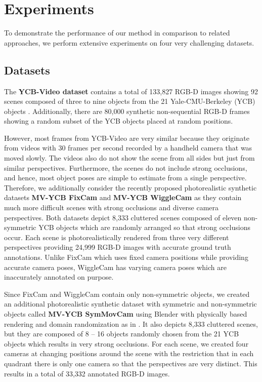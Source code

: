 
\section{Experiments}

To demonstrate the performance of our method in comparison to related approaches, we perform extensive experiments on four very challenging datasets.



\subsection{Datasets}

The {\bf YCB-Video dataset} \cite{posecnn} contains a total of 133,827 RGB-D images showing 92 scenes composed of three to nine objects from the 21 Yale-CMU-Berkeley (YCB) objects \cite{ycb}.
Additionally, there are 80,000 synthetic non-sequential \mbox{RGB-D} frames showing a random subset of the YCB objects placed at random positions.

However, most frames from YCB-Video are very similar because they originate from videos with 30 frames per second recorded by a handheld camera that was moved slowly. The videos also do not show the scene from all sides but just from similar perspectives. Furthermore, the scenes do not include strong occlusions, and hence, most object poses are simple to estimate from a single perspective. 
Therefore, we additionally consider the recently proposed photorealistic synthetic datasets {\bf MV-YCB FixCam} and {\bf MV-YCB WiggleCam} \cite{mv6d} as they contain much more difficult scenes with strong occlusions and diverse camera perspectives.
Both datasets depict 8,333 cluttered scenes composed of eleven non-symmetric YCB objects which are randomly arranged so that strong occlusions occur. Each scene is photorealistically rendered from three very different perspectives providing 24,999 RGB-D images with accurate ground truth annotations. Unlike FixCam which uses fixed camera positions while providing accurate camera poses, WiggleCam has varying camera poses which are inaccurately annotated on purpose.

Since FixCam and WiggleCam contain only non-symmetric objects, we created an additional photorealistic synthetic dataset with symmetric and non-symmetric objects called {\bf MV-YCB SymMovCam} using Blender with physically based rendering and domain randomization as in \cite{mv6d}. It also depicts 8,333 cluttered scenes, but they are composed of 8 -- 16 objects randomly chosen from the 21 YCB objects which results in very strong occlusions. For each scene, we created four cameras at changing positions around the scene with the restriction that in each quadrant there is only one camera so that the perspectives are very distinct. This results in a total of 33,332 annotated RGB-D images.



